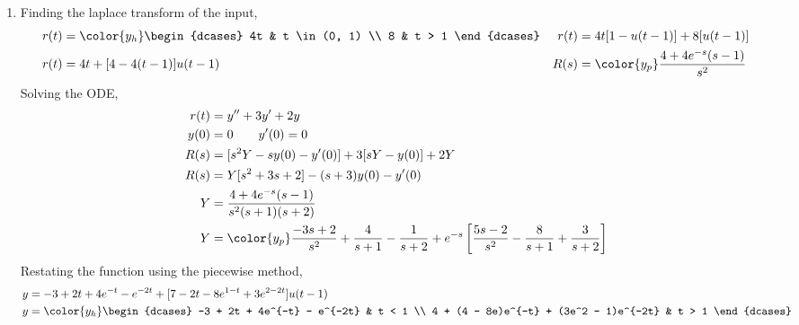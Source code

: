 \begin{enumerate}
    \item Finding the laplace transform of the input,
          \begin{align}
              r(t)                 & = \color{y_h}
              \begin{dcases}
                  4t & t \in (0, 1) \\
                  8  & t > 1
              \end{dcases} &
              r(t)                 & = 4t[1 - u(t-1)] + 8[u(t-1)]                   \\
              r(t)                 & = 4t + [4 - 4(t - 1)]u(t-1)                  &
              R(s)                 & = \color{y_p} \frac{4 + 4e^{-s}(s - 1)}{s^2}
          \end{align}
          Solving the ODE,
          \begin{align}
              r(t) & = y'' + 3y' + 2y                                  \\
              y(0) & = 0 \qquad y'(0) = 0                              \\
              R(s) & = [s^2Y - sy(0) - y'(0)] + 3[sY - y(0)] + 2Y      \\
              R(s) & = Y[s^2 + 3s + 2] - (s+3)y(0) - y'(0)             \\
              Y    & = \frac{4 + 4e^{-s}(s-1)}{s^2(s+1)(s+2)}          \\
              Y    & = \color{y_p} \frac{-3s+2}{s^2} + \frac{4}{s + 1}
              - \frac{1}{s+2} + e^{-s}\left[ \frac{5s-2}{s^2}
                  - \frac{8}{s + 1} + \frac{3}{s + 2} \right]
          \end{align}
          Restating the function using the piecewise method,
          \begin{align}
              y & = -3 + 2t + 4e^{-t} - e^{-2t} +
              [7 - 2t - 8e^{1-t} + 3e^{2-2t}]u(t-1) \\
              y & = \color{y_h}
              \begin{dcases}
                  -3 + 2t + 4e^{-t} - e^{-2t}            & t < 1 \\
                  4 + (4 - 8e)e^{-t} + (3e^2 - 1)e^{-2t} & t > 1
              \end{dcases}
          \end{align}


\end{enumerate}
